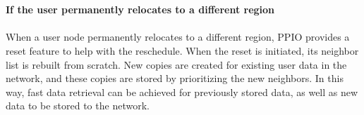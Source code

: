 \documentclass[10pt,a4paper]{article}
\begin{document}
\vspace{-0.5em}
\\ \\{\bf If the user permanently relocates to a different region}
\vspace{-0.5em}
\\ \\When a user node permanently relocates to a different region, PPIO provides a reset feature to help with the reschedule. When the reset is initiated, its neighbor list is rebuilt from scratch. New copies are created for existing user data in the network, and these copies are stored by prioritizing the new neighbors. In this way, fast data retrieval can be achieved for previously stored data, as well as new data to be stored to the network.  
\vspace{-0.5em}
\end{document}
